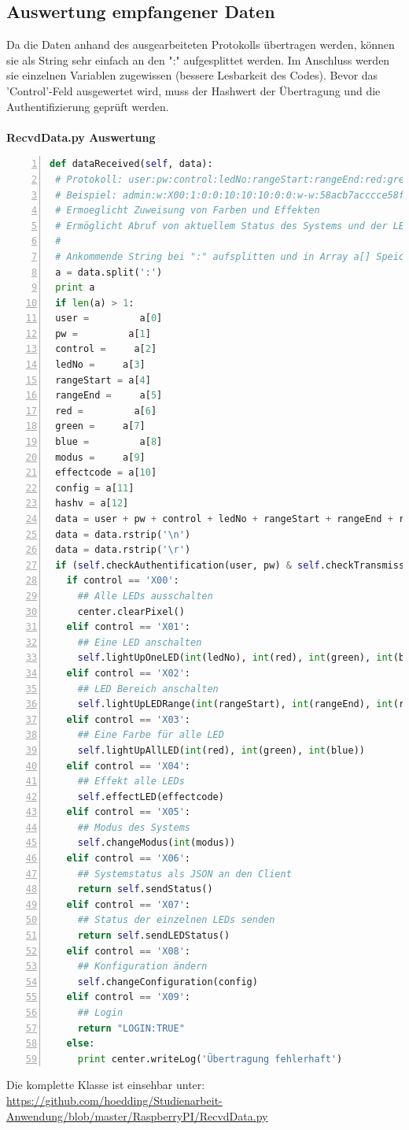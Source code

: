 \subsection{Auswertung empfangener Daten}
Da die Daten anhand des ausgearbeiteten Protokolls übertragen werden, können sie als String sehr einfach an den ":" aufgesplittet werden. Im Anschluss werden sie einzelnen Variablen zugewissen (bessere Lesbarkeit des Codes). Bevor das 'Control'-Feld ausgewertet wird, muss der Hashwert der Übertragung und die Authentifizierung geprüft werden. \\\\
\textbf{RecvdData.py Auswertung} 
\begin{lstlisting}[caption=Auswertung der empfangenen Daten (RcvdData.py), language=python, frame=single, breaklines=true,columns=fullflexible, commentstyle=\color{gray}\upshape, captionpos=b, numbers = left]
def dataReceived(self, data):
 # Protokoll: user:pw:control:ledNo:rangeStart:rangeEnd:red:green:blue:modus:effectcode:config:hashv
 # Beispiel: admin:w:X00:1:0:0:10:10:10:0:0:w-w:58acb7acccce58ffa8b953b12b5a7702bd42dae441c1ad85057fa70b
 # Ermoeglicht Zuweisung von Farben und Effekten
 # Ermöglicht Abruf von aktuellem Status des Systems und der LEDs
 #
 # Ankommende String bei ":" aufsplitten und in Array a[] Speichern:
 a = data.split(':')
 print a
 if len(a) > 1:
 user =         a[0]
 pw =         a[1]
 control =     a[2]
 ledNo =     a[3]
 rangeStart = a[4]
 rangeEnd =     a[5]
 red =         a[6]
 green =     a[7]
 blue =         a[8]
 modus =     a[9]
 effectcode = a[10]
 config = a[11]
 hashv = a[12]
 data = user + pw + control + ledNo + rangeStart + rangeEnd + red + green + blue + modus + effectcode + config
 data = data.rstrip('\n')
 data = data.rstrip('\r')
 if (self.checkAuthentification(user, pw) & self.checkTransmissionData(data, hashv)):
   if control == 'X00':
     ## Alle LEDs ausschalten
     center.clearPixel()
   elif control == 'X01':
     ## Eine LED anschalten
     self.lightUpOneLED(int(ledNo), int(red), int(green), int(blue))
   elif control == 'X02':
     ## LED Bereich anschalten
     self.lightUpLEDRange(int(rangeStart), int(rangeEnd), int(red), int(green), int(blue))
   elif control == 'X03':
     ## Eine Farbe für alle LED
     self.lightUpAllLED(int(red), int(green), int(blue))
   elif control == 'X04':
     ## Effekt alle LEDs
     self.effectLED(effectcode)
   elif control == 'X05':
     ## Modus des Systems
     self.changeModus(int(modus))
   elif control == 'X06':
     ## Systemstatus als JSON an den Client
     return self.sendStatus()
   elif control == 'X07':
     ## Status der einzelnen LEDs senden
     return self.sendLEDStatus()
   elif control == 'X08':
     ## Konfiguration ändern
     self.changeConfiguration(config)
   elif control == 'X09':
     ## Login
     return "LOGIN:TRUE"
   else:
     print center.writeLog('Übertragung fehlerhaft')
\end{lstlisting}
Die komplette Klasse ist einsehbar unter: \url{https://github.com/hoedding/Studienarbeit-Anwendung/blob/master/RaspberryPI/RecvdData.py} \\\\ 

